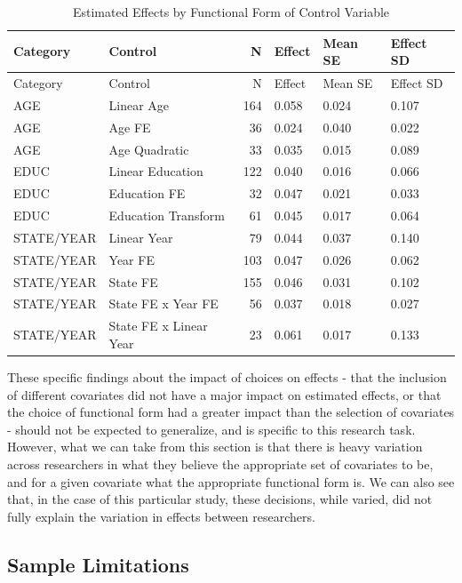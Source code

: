 \documentclass[
  letterpaper,
  DIV=11,
  numbers=noendperiod]{scrartcl}
\begin{document}
\begin{longtable}[]{@{}llrlll@{}}
\caption{Estimated Effects by Functional Form of Control Variable
\label{tab-effects-by-functional-form}}\tabularnewline
\toprule\noalign{}
Category & Control & N & Effect & Mean SE & Effect SD \\
\midrule\noalign{}
\endfirsthead
\toprule\noalign{}
Category & Control & N & Effect & Mean SE & Effect SD \\
\midrule\noalign{}
\endhead
\bottomrule\noalign{}
\endlastfoot
AGE & Linear Age & 164 & 0.058 & 0.024 & 0.107 \\
AGE & Age FE & 36 & 0.024 & 0.040 & 0.022 \\
AGE & Age Quadratic & 33 & 0.035 & 0.015 & 0.089 \\
EDUC & Linear Education & 122 & 0.040 & 0.016 & 0.066 \\
EDUC & Education FE & 32 & 0.047 & 0.021 & 0.033 \\
EDUC & Education Transform & 61 & 0.045 & 0.017 & 0.064 \\
STATE/YEAR & Linear Year & 79 & 0.044 & 0.037 & 0.140 \\
STATE/YEAR & Year FE & 103 & 0.047 & 0.026 & 0.062 \\
STATE/YEAR & State FE & 155 & 0.046 & 0.031 & 0.102 \\
STATE/YEAR & State FE x Year FE & 56 & 0.037 & 0.018 & 0.027 \\
STATE/YEAR & State FE x Linear Year & 23 & 0.061 & 0.017 & 0.133 \\
\end{longtable}

These specific findings about the impact of choices on effects - that
the inclusion of different covariates did not have a major impact on
estimated effects, or that the choice of functional form had a greater
impact than the selection of covariates - should not be expected to
generalize, and is specific to this research task. However, what we can
take from this section is that there is heavy variation across
researchers in what they believe the appropriate set of covariates to
be, and for a given covariate what the appropriate functional form is.
We can also see that, in the case of this particular study, these
decisions, while varied, did not fully explain the variation in effects
between researchers.

\hypertarget{sec-sample-limitations}{%
\subsection{Sample Limitations}\label{sec-sample-limitations}}
\end{document}
